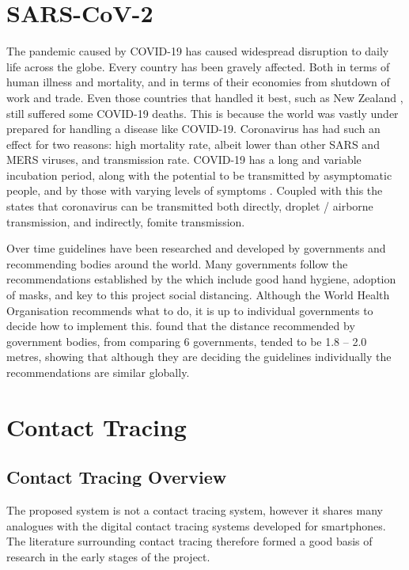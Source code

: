 \documentclass{l4proj}
\begin{document}
\section{SARS-CoV-2}

The pandemic caused by COVID-19 has caused widespread disruption to daily life across the globe. Every country has been gravely affected. Both in terms of human illness and mortality, and in terms of their economies from shutdown of work and trade. Even those countries that handled it best, such as New Zealand \citep{robert_lessons_2020}, still suffered some COVID-19 deaths. This is because the world was vastly under prepared for handling a disease like COVID-19. Coronavirus has had such an effect for two reasons: high mortality rate, albeit lower than other SARS and MERS viruses, and transmission rate. COVID-19 has a long and variable incubation period, along with the potential to be transmitted by asymptomatic people, and by those with varying levels of symptoms \citep{vannabouathong_novel_2020}. Coupled with this the \citet{world_health_organisation_transmission_2020} states that coronavirus can be transmitted both directly, droplet / airborne transmission, and indirectly, fomite transmission.

Over time guidelines have been researched and developed by governments and recommending bodies around the world. Many governments follow the recommendations established by the \cite{world_health_organization_responding_2020} which include good hand hygiene, adoption of masks, and key to this project social distancing. Although the World Health Organisation recommends what to do, it is up to individual governments to decide how to implement this.\citet{yoo_comparative_2020} found that the distance recommended by government bodies, from comparing 6 governments, tended to be 1.8 – 2.0 metres, showing that although they are deciding the guidelines individually the recommendations are similar globally.

\section{Contact Tracing}

\subsection{Contact Tracing Overview}

The proposed system is not a contact tracing system, however it shares many analogues with the digital contact tracing systems developed for smartphones. The literature surrounding contact tracing therefore formed a good basis of research in the early stages of the project.
\end{document}

